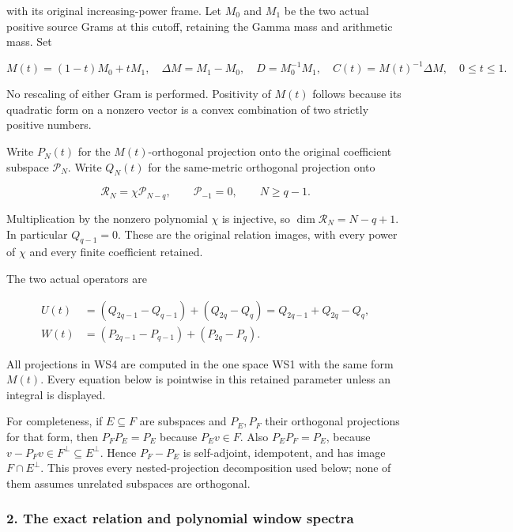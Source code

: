 with its original increasing-power frame. Let \(M_0\) and \(M_1\) be the two actual positive source Grams at this cutoff, retaining the Gamma mass and arithmetic mass. Set

\[
M(t)=(1-t)M_0+tM_1,
\quad \Delta M=M_1-M_0,
\quad D=M_0^{-1}M_1,
\quad C(t)=M(t)^{-1}\Delta M,
\quad 0\le t\le1.
\tag{WS2}
\]

No rescaling of either Gram is performed. Positivity of \(M(t)\) follows because its quadratic form on a nonzero vector is a convex combination of two strictly positive numbers.

Write \(P_N(t)\) for the \(M(t)\)-orthogonal projection onto the original coefficient subspace \(\mathcal P_N\). Write \(Q_N(t)\) for the same-metric orthogonal projection onto

\[
\mathcal R_N=\chi\mathcal P_{N-q},
\qquad \mathcal P_{-1}=0,
\qquad N\ge q-1.
\tag{WS3}
\]

Multiplication by the nonzero polynomial \(\chi\) is injective, so \(\dim\mathcal R_N=N-q+1\). In particular \(Q_{q-1}=0\). These are the original relation images, with every power of \(\chi\) and every finite coefficient retained.

The two actual operators are

\[
\begin{aligned}
U(t)&=(Q_{2q-1}-Q_{q-1})+(Q_{2q}-Q_q)
     =Q_{2q-1}+Q_{2q}-Q_q,\\
W(t)&=(P_{2q-1}-P_{q-1})+(P_{2q}-P_q).
\end{aligned}
\tag{WS4}
\]

All projections in WS4 are computed in the one space WS1 with the same form \(M(t)\). Every equation below is pointwise in this retained parameter unless an integral is displayed.

For completeness, if \(E\subseteq F\) are subspaces and \(P_E,P_F\) their orthogonal projections for that form, then \(P_FP_E=P_E\) because \(P_Ev\in F\). Also \(P_E P_F=P_E\), because \(v-P_Fv\in F^\perp\subseteq E^\perp\). Hence \(P_F-P_E\) is self-adjoint, idempotent, and has image \(F\cap E^\perp\). This proves every nested-projection decomposition used below; none of them assumes unrelated subspaces are orthogonal.

\subsubsection{2. The exact relation and polynomial window spectra}\label{endpoint-window_review--the-exact-relation-and-polynomial-window-spectra}


